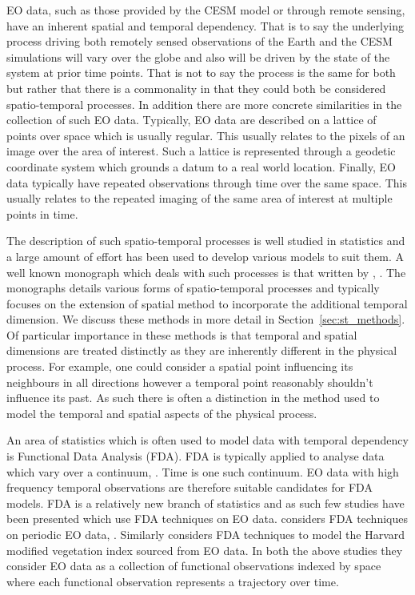 EO data, such as those provided by the CESM model or through remote sensing, have an inherent spatial and temporal dependency.
That is to say the underlying process driving both remotely sensed observations of the Earth and the CESM simulations will vary over the globe and also will be driven by the state of the system at prior time points.
That is not to say the process is the same for both but rather that there is a commonality in that they could both be considered spatio-temporal processes.
In addition there are more concrete similarities in the collection of such EO data.
Typically, EO data are described on a lattice of points over space which is usually regular.
This usually relates to the pixels of an image over the area of interest.
Such a lattice is represented through a geodetic coordinate system which grounds a datum to a real world location.
Finally, EO data typically have repeated observations through time over the same space.
This usually relates to the repeated imaging of the same area of interest at multiple points in time.

The description of such spatio-temporal processes is well studied in statistics and a large amount of effort has been used to develop various models to suit them.
A well known monograph which deals with such processes is that written by \citeauthor{cressie_statistics_2011}, \cite{cressie_statistics_2011}.
The monographs details various forms of spatio-temporal processes and typically focuses on the extension of spatial method to incorporate the additional temporal dimension.
We discuss these methods in more detail in Section~\ref{sec:st_methods}.
Of particular importance in these methods is that temporal and spatial dimensions are treated distinctly as they are inherently different in the physical process.
For example, one could consider a spatial point influencing its neighbours in all directions however a temporal point reasonably shouldn't influence its past.
As such there is often a distinction in the method used to model the temporal and spatial aspects of the physical process.

An area of statistics which is often used to model data with temporal dependency is Functional Data Analysis (FDA).
FDA is typically applied to analyse data which vary over a continuum, \citep{ramsay_functional_2010}.
Time is one such continuum.
EO data with high frequency temporal observations are therefore suitable candidates for FDA models.
FDA is a relatively new branch of statistics and as such few studies have been presented which use FDA techniques on EO data.
\citeauthor{liu_functional_2012} considers FDA techniques on periodic EO data, \citep{liu_functional_2012}. 
Similarly \citeauthor{hooker_maximal_2015} considers FDA techniques to model the Harvard modified vegetation index sourced from EO data.
In both the above studies they consider EO data as a collection of functional observations indexed by space where each functional observation represents a trajectory over time.

